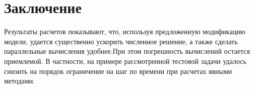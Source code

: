 \section{Заключение}
Результаты расчетов показывают, что, используя предложенную модификацию модели, удается существенно ускорить
численное решение, а также сделать параллельные вычисления удобнее.При этом погрешность вычислений остается
приемлемой. В частности, на примере рассмотренной тестовой задачи удалось снизить на порядок ограничение на шаг по времени
при расчетах явными методами.